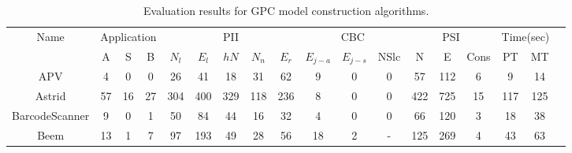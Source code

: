 \begin{table*}[!t]
\centering
\begin{threeparttable}[b]
\caption{Evaluation results for GPC model construction algorithms.} 
\newcommand{\tabincell}[2]{\begin{tabular}{@{}#1@{}}#2\end{tabular}}
\footnotesize

\begin{tabular}{|c|c|c|c|c|c|c|c|c|c|c|c|c|c|c|c|c|c|}
\hline 
\multirow{2}{*}{Name} &\multicolumn{3}{|c|}{Application} & \multicolumn{5}{c|}{PII} & \multicolumn{3}{c|}{CBC} & \multicolumn{3}{c|}{PSI}  &\multicolumn{2}{c|}{Time(sec)}\\
\cline{2-17}
& A & S & B &      $N_{l}$ & $E_{l}$ & $hN$ &  $N_{n}$ & $E_{r}$&     $E_{j-a}$ & $E_{j-s}$ & NSlc&   N & E & Cons&  PT & MT \\ 
\hline 
\hline 
APV & 4 & 0 & 0 &    26& 41 & 18 & 31 & 62       &9 & 0 &0 &    57 & 112 & 6     & 9 & 14\\ 
\hline 
Astrid &  57 & 16 & 27 &    304& 400 & 329 & 118 & 236      & 8 & 0 &0 &    422 & 725 & 15    & 117 & 125\\ 
\hline 
BarcodeScanner & 9 & 0 & 1 &    50& 84 & 44 & 16 & 32       &4 & 0 &0 &    66 & 120 & 3    & 18 & 38\\ 
\hline 
Beem &  13 &1 & 7 &    97& 193 & 49 & 28 & 56       &18 & 2 &- &    125 & 269 & 4    & 43 & 63\\ 


\end{tabular}
\end{threeparttable}
\end{table*}
